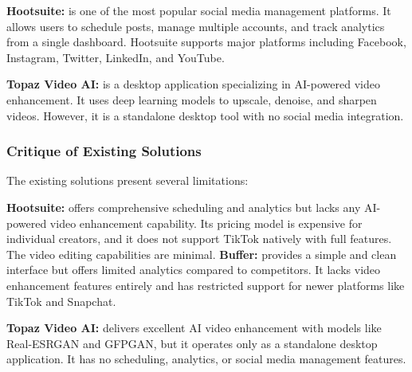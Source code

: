 \textbf{Hootsuite:} is one of the most popular social media management platforms. It allows users to schedule posts, manage multiple accounts, and track analytics from a single dashboard. Hootsuite supports major platforms including Facebook, Instagram, Twitter, LinkedIn, and YouTube.


\textbf{Topaz Video AI:} is a desktop application specializing in AI-powered video enhancement. It uses deep learning models to upscale, denoise, and sharpen videos. However, it is a standalone desktop tool with no social media integration.
\subsubsection{Critique of Existing Solutions}

The existing solutions present several limitations:

\textbf{Hootsuite:} offers comprehensive scheduling and analytics but lacks any AI-powered video enhancement capability. Its pricing model is expensive for individual creators, and it does not support TikTok natively with full features. The video editing capabilities are minimal.
\textbf{Buffer:} provides a simple and clean interface but offers limited analytics compared to competitors. It lacks video enhancement features entirely and has restricted support for newer platforms like TikTok and Snapchat.

\textbf{Topaz Video AI:} delivers excellent AI video enhancement with models like Real-ESRGAN and GFPGAN, but it operates only as a standalone desktop application. It has no scheduling, analytics, or social media management features.


